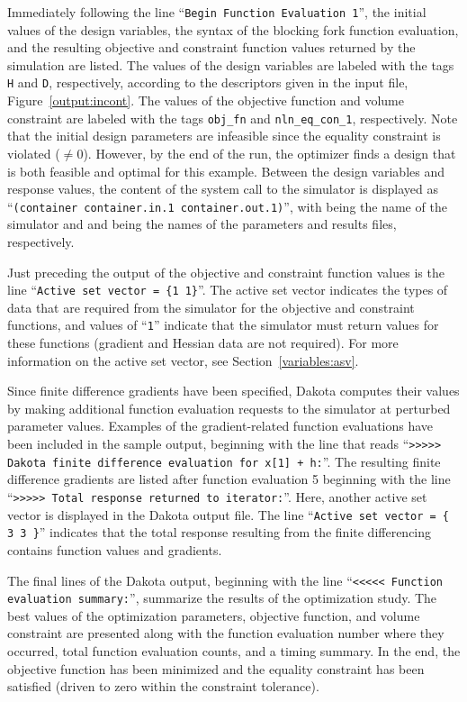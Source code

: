 Immediately following the line ``\texttt{Begin Function Evaluation
  1}'', the initial values of the design variables, the syntax of the
blocking fork function evaluation, and the resulting objective and
constraint function values returned by the simulation are listed.  The
values of the design variables are labeled with the tags \texttt{H}
and \texttt{D}, respectively, according to the descriptors given in
the input file, Figure~\ref{output:incont}.  The values of the
objective function and volume constraint are labeled with the tags
\texttt{obj\_fn} and \texttt{nln\_eq\_con\_1}, respectively. Note that
the initial design parameters are infeasible since the equality
constraint is violated ($\ne 0$). However, by the end of the run, the
optimizer finds a design that is both feasible and optimal for this
example. Between the design variables and response values, the content
of the system call to the simulator is displayed as
``\texttt{(container container.in.1 container.out.1)}'', with
 being the name of the simulator and
 and  being the names
of the parameters and results files, respectively.

Just preceding the output of the objective and constraint function
values is the line ``\texttt{Active set vector = \{1 1\}}''. The
active set vector indicates the types of data that are required from
the simulator for the objective and constraint functions, and values
of ``\texttt{1}'' indicate that the simulator must return values for
these functions (gradient and Hessian data are not required). For more
information on the active set vector, see Section~\ref{variables:asv}.

Since finite difference gradients have been specified, Dakota computes
their values by making additional function evaluation requests to the
simulator at perturbed parameter values. Examples of the
gradient-related function evaluations have been included in the sample
output, beginning with the line that reads ``\texttt{>>>>> Dakota
  finite difference evaluation for x[1] + h:}''. The resulting finite
difference gradients are listed after function evaluation 5 beginning
with the line ``\texttt{>>>>> Total response returned to iterator:}''.
Here, another active set vector is displayed in the Dakota output
file. The line ``\texttt{Active set vector = \{ 3 3 \}}'' indicates
that the total response resulting from the finite differencing
contains function values and gradients.

The final lines of the Dakota output, beginning with the line
``\texttt{<<<<< Function evaluation summary:}'', summarize the
results of the optimization study. The best values of the optimization
parameters, objective function, and volume constraint are presented
along with the function evaluation number where they occurred, total
function evaluation counts, and a timing summary. In the end, the
objective function has been minimized and the equality constraint has
been satisfied (driven to zero within the constraint tolerance).

